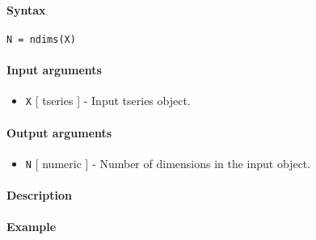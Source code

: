 


	\paragraph{Syntax}\label{syntax}

\begin{verbatim}
N = ndims(X)
\end{verbatim}

\paragraph{Input arguments}\label{input-arguments}

\begin{itemize}
\itemsep1pt\parskip0pt
\item
  \texttt{X} {[} tseries {]} - Input tseries object.
\end{itemize}

\paragraph{Output arguments}\label{output-arguments}

\begin{itemize}
\itemsep1pt\parskip0pt
\item
  \texttt{N} {[} numeric {]} - Number of dimensions in the input object.
\end{itemize}

\paragraph{Description}\label{description}

\paragraph{Example}\label{example}


